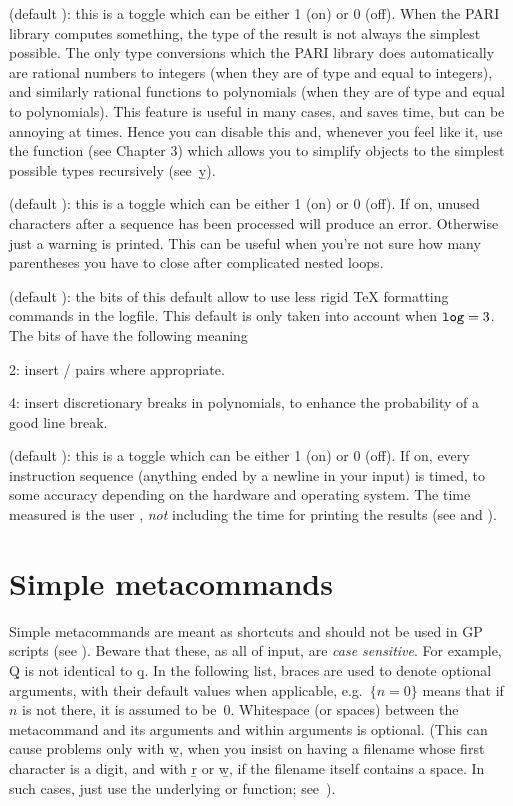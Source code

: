  (default ): this is a toggle which can be either
1 (on) or 0 (off). When the PARI library computes something, the type of the
result is not always the simplest possible. The only type conversions which
the PARI library does automatically are rational numbers to integers (when
they are of type  and equal to integers), and similarly rational
functions to polynomials (when they are of type  and equal to
polynomials). This feature is useful in many cases, and saves time, but can
be annoying at times. Hence you can disable this and, whenever you feel like
it, use the function  (see Chapter 3) which allows you to
simplify objects to the simplest possible types recursively (see~\b{y}).

 (default ): this is a toggle which can be
either 1 (on) or 0 (off). If on, unused characters after a sequence has been
processed will produce an error. Otherwise just a warning is printed. This
can be useful when you're not sure how many parentheses you have to close after
complicated nested loops.

 (default ): the bits of this default allow
 to use less rigid TeX formatting commands in the logfile. This
default is only taken into account when ${\tt log} = 3$. The bits of
 have the following meaning

2: insert  /  pairs where appropriate.

4: insert discretionary breaks in polynomials, to enhance the probability of
a good line break.

 (default ): this is a toggle which can be either 1
(on) or 0 (off). If on, every instruction sequence (anything ended by a
newline in your input) is timed, to some accuracy depending on the hardware
and operating system. The time measured is the user ,
\emph{not} including the time for printing the results (see \kbd{\#} and
\kbd{\#\#}).

\section{Simple metacommands}\label{se:meta}

\noindent
Simple metacommands are meant as shortcuts and should not be used in GP
scripts (see ). Beware that these, as all of  input,
are \emph{case sensitive}. For example, \b{Q} is not identical to \b{q}. In
the following list, braces are used to denote optional arguments, with their
default values when applicable, e.g.~$\{n=0\}$ means that if $n$ is not
there, it is assumed to be~$0$. Whitespace (or spaces) between the
metacommand and its arguments and within arguments is optional. (This can
cause problems only with \b{w}, when you insist on having a filename whose
first character is a digit, and with \b{r} or \b{w}, if the filename itself
contains a space. In such cases, just use the underlying  or
 function; see~).

